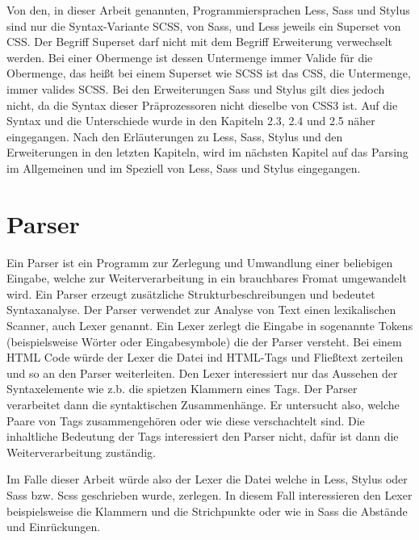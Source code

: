 Von den, in dieser Arbeit genannten, Programmiersprachen Less, Sass und Stylus sind nur die Syntax-Variante SCSS, von Sass, und Less jeweils ein Superset von CSS. \newline
Der Begriff Superset darf nicht mit dem Begriff Erweiterung verwechselt werden.\newline
Bei einer Obermenge ist dessen Untermenge immer Valide für die Obermenge, das heißt bei einem Superset wie SCSS ist das CSS, die Untermenge, immer valides SCSS.\newline
Bei den Erweiterungen Sass und Stylus gilt dies jedoch nicht, da die Syntax dieser Präprozessoren nicht dieselbe von CSS3 ist. Auf die Syntax und die Unterschiede wurde in den Kapiteln 2.3, 2.4 und 2.5 näher eingegangen.\newline\newline
Nach den Erläuterungen zu Less, Sass, Stylus und den Erweiterungen in den letzten Kapiteln, wird im nächsten Kapitel auf das Parsing im Allgemeinen und im Speziell von Less, Sass und Stylus eingegangen.

\section{Parser}
Ein Parser ist ein Programm zur Zerlegung und Umwandlung einer beliebigen Eingabe, welche zur Weiterverarbeitung in ein brauchbares Fromat umgewandelt wird. Ein Parser erzeugt zusätzliche Strukturbeschreibungen und bedeutet Syntaxanalyse. \newline
Der Parser verwendet zur Analyse von Text einen lexikalischen Scanner, auch Lexer genannt. Ein Lexer zerlegt die Eingabe in sogenannte Tokens (beispielsweise Wörter oder Eingabesymbole) die der Parser versteht. \newline
Bei einem HTML Code würde der Lexer die Datei ind HTML-Tags und Fließtext zerteilen und so an den Parser weiterleiten. Den Lexer interessiert nur das Aussehen der Syntaxelemente wie z.b. die spietzen Klammern eines Tags. Der Parser verarbeitet dann die syntaktischen Zusammenhänge. Er untersucht also, welche Paare von Tags zusammengehören oder wie diese verschachtelt sind. Die inhaltliche Bedeutung der Tags interessiert den Parser nicht, dafür ist dann die Weiterverarbeitung zuständig.

Im Falle dieser Arbeit würde also der Lexer die Datei welche in Less, Stylus oder Sass bzw. Scss geschrieben wurde, zerlegen. In diesem Fall interessieren den Lexer beispielsweise die Klammern und die Strichpunkte oder wie in Sass die Abstände und Einrückungen.

